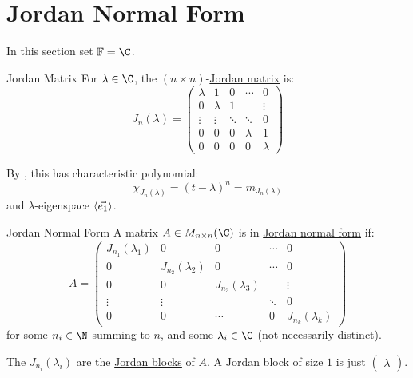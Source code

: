 \documentclass[../Main.tex]{subfiles}
\begin{document}
\section{Jordan Normal Form}
In this section set $\F = \C$.
\begin{definition}{Jordan Matrix}
    For $\lambda \in \C$, the $(n \times n)$-\underline{Jordan matrix} is:
    \begin{equation*}
        J_n(\lambda) =
        \begin{pmatrix}
            \lambda & 1 & 0 & \cdots & 0 \\
            0 & \lambda & 1 & & \vdots \\
            \vdots & \vdots & \ddots & \ddots & 0 \\
            0 & 0 & 0 & \lambda & 1 \\
            0 & 0 & 0 & 0 & \lambda
        \end{pmatrix}
    \end{equation*}
\end{definition}
\begin{remark}
    By , this has characteristic polynomial:
    \begin{equation*}
        \chi_{J_n(\lambda)} = (t - \lambda)^n = m_{J_n(\lambda)}
    \end{equation*}
    and $\lambda$-eigenspace $\left\langle \vec{e_1} \right\rangle$.
    \label{remJordanBlockMults}
\end{remark}
\begin{definition}{Jordan Normal Form}
    A matrix $A \in M_{n \times n}(\C)$ is in \underline{Jordan normal form} if:
    \begin{equation*}
        A =
        \begin{pmatrix}
            J_{n_1}(\lambda_1) & 0 & 0 & \cdots & 0 \\
            0 & J_{n_2}(\lambda_2) & 0 & \cdots & 0 \\
            0 & 0 & J_{n_3}(\lambda_3) & & \vdots \\
            \vdots & \vdots & & \ddots & 0 \\
            0 & 0 & \cdots & 0 & J_{n_k}(\lambda_k)
        \end{pmatrix}
    \end{equation*}
    for some $n_i \in \N$ summing to $n$, and some $\lambda_i \in \C$ (not necessarily distinct).

    The $J_{n_i}(\lambda_i)$ are the \underline{Jordan blocks} of $A$. A Jordan block of size $1$ is just $\left(\begin{smallmatrix}\lambda\end{smallmatrix}\right)$.
\end{definition}
\end{document}
